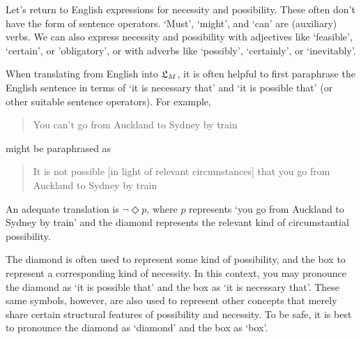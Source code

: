Let's return to English expressions for necessity and possibility. These often
don't have the form of sentence operators. `Must', `might', and `can' are
(auxiliary) verbs. We can also express necessity and possibility with adjectives
like `feasible', `certain', or 'obligatory', or with adverbs like `possibly',
`certainly', or `inevitably'.

When translating from English into $\mathfrak{L}_{M}$, it is often helpful to first
paraphrase the English sentence in terms of `it is necessary that' and `it is
possible that' (or other suitable sentence operators). For example,
\begin{quote}
  You can't go from Auckland to Sydney by train
\end{quote}
might be paraphrased as
\begin{quote}
  It is not possible [in light of relevant circumstances] that you go from
  Auckland to Sydney by train
\end{quote}
An adequate translation is $\neg\Diamond p$, where $p$ represents `you go from
Auckland to Sydney by train' and the diamond represents the relevant kind of
circumstantial possibility.

The diamond is often used to represent some kind of possibility, and the box to
represent a corresponding kind of necessity. In this context, you may pronounce
the diamond as `it is possible that' and the box as `it is necessary that'.
These same symbols, however, are also used to represent other concepts that
merely share certain structural features of possibility and necessity. To be
safe, it is best to pronounce the diamond as `diamond' and the box as `box'.

